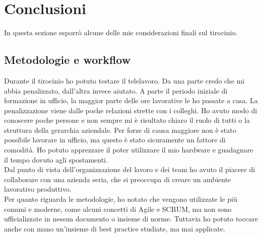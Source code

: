 \section{Conclusioni}

In questa sezione esporrò alcune delle mie considerazioni finali sul tirocinio.

\subsection{Metodologie e workflow}
Durante il tirocinio ho potuto testare il telelavoro. Da una parte credo che mi abbia penalizzato, dall'altra invece aiutato. A parte il periodo iniziale di formazione in ufficio, la maggior parte delle ore lavorative le ho passate a casa. La penalizzazione viene dalle poche relazioni strette con i colleghi. Ho avuto modo di conoscere poche persone e non sempre mi è risultato chiaro il ruolo di tutti o la struttura della gerarchia aziendale. Per forze di causa maggiore non è stato possibile lavorare in ufficio, ma questo è stato sicuramente un fattore di comodità. Ho potuto apprezzare il poter utilizzare il mio hardware e guadagnare il tempo dovuto agli spostamenti. \\
Dal punto di vista dell'organizzazione del lavoro e dei team ho avuto il piacere di collaborare con una azienda seria, che si preoccupa di creare un ambiente lavorativo produttivo. \\
Per quanto riguarda le metodologie, ho notato che vengono utilizzate le più comuni e moderne, come alcuni concetti di Agile e SCRUM, ma non sono ufficializzate in nessun documento o insieme di norme. 
Tuttavia ho potuto toccare anche con mano un'insieme di best practice studiate, ma mai applicate. 

